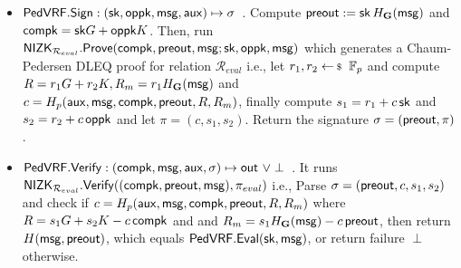 \begin{itemize}
	\item ${\mathsf{PedVRF}}.{\mathsf{Sign}} : (\mathsf{sk},\mathsf{oppk},\mathsf{msg},\mathsf{aux}) \mapsto \sigma$ \,.
	Compute ${\mathsf{preout}} := \mathsf{sk} \, H_{{\mathbf{G}}}(\mathsf{msg})$ and $ \mathsf{compk} = \mathsf{sk} G + \mathsf{oppk}K $. Then, run ${\mathsf{NIZK}}_{\mathcal{R}_{eval}}.{\mathsf{Prove}}(\mathsf{compk}, {\mathsf{preout}}, \mathsf{msg};\mathsf{sk},\mathsf{oppk},\mathsf{msg})  $ which generates a Chaum-Pedersen DLEQ proof
	for relation $\mathcal{R}_{eval}$ i.e.,
	let $r_1,r_2 \leftsample \F_p$
	and compute $R = r_1 G + r_2 K, R_m = r_1 H_{{\mathbf{G}}}(\mathsf{msg}) $ and $c = H_p(\mathsf{aux},\mathsf{msg},\mathsf{compk},{\mathsf{preout}},R,R_m)$, finally compute $s_1 = r_1 + c \, \mathsf{sk}$ and $s_2 = r_2 + c \, \mathsf{oppk}$ and let $ \pi = (c,s_1,s_2) $.
	Return the signature $\sigma = ({\mathsf{preout}},\pi) $.
	
	\item ${\mathsf{PedVRF}}.{\mathsf{Verify}} : (\mathsf{compk},\mathsf{msg},\mathsf{aux},\sigma) \mapsto {\ensuremath{\mathsf{out}}} \,\, \lor \perp$ \,.
	It runs  $ {\mathsf{NIZK}}_{\mathcal{R}_{eval}}.{\mathsf{Verify}}((\mathsf{compk},{\mathsf{preout}},\mathsf{msg}), \pi_{eval} ) $ i.e.,
	Parse $\sigma = ({\mathsf{preout}},c,s_1,s_2) $ and check if 
	$c = H_p(\mathsf{aux},\mathsf{msg},\mathsf{compk},{\mathsf{preout}},R,R_m)$ where  $ R = s_1 G + s_2 K - c \, \mathsf{compk}$ and
	and $ R_m = s_1 H_{{\mathbf{G}}}(\mathsf{msg}) - c \, {\mathsf{preout}}$,
	then return $H(\mathsf{msg},{\mathsf{preout}})$, which equals ${\mathsf{PedVRF}}.{\mathsf{Eval}}(\mathsf{sk},\mathsf{msg})$,
	or return failure $\perp$ otherwise.
\end{itemize}




